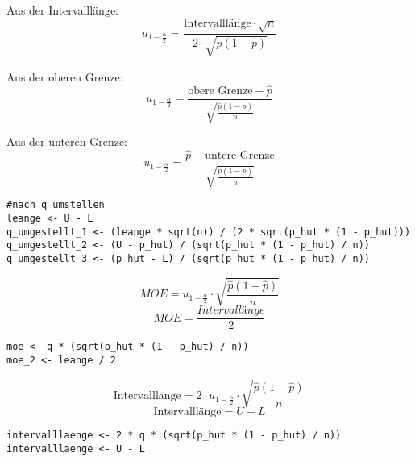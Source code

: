 \begin{multicols*}{2}
Aus der Intervalll\"ange:
\[
u_{1 - \frac{\alpha}{2}} = \frac{\text{Intervalll\"ange} \cdot \sqrt{n}}{2 \cdot \sqrt{\hat{p}(1-\hat{p})}}
\]


Aus der oberen Grenze:
\[
u_{1 - \frac{\alpha}{2}} = \frac{\text{obere Grenze} - \hat{p}}{\sqrt{\frac{\hat{p}(1-\hat{p})}{n}}}
\]

Aus der unteren Grenze:
\[
u_{1 - \frac{\alpha}{2}} = \frac{\hat{p} - \text{untere Grenze}}{\sqrt{\frac{\hat{p}(1-\hat{p})}{n}}}
\]

\begin{lstlisting}
#nach q umstellen
leange <- U - L
q_umgestellt_1 <- (leange * sqrt(n)) / (2 * sqrt(p_hut * (1 - p_hut)))
q_umgestellt_2 <- (U - p_hut) / (sqrt(p_hut * (1 - p_hut) / n))
q_umgestellt_3 <- (p_hut - L) / (sqrt(p_hut * (1 - p_hut) / n))
\end{lstlisting}



\[
MOE = u_{1 - \frac{\alpha}{2}} \cdot \sqrt{\frac{\hat{p}(1-\hat{p})}{n}}
\]
$$
MOE = \frac{Intervallänge}{2}
$$

\begin{lstlisting}
moe <- q * (sqrt(p_hut * (1 - p_hut) / n))
moe_2 <- leange / 2
\end{lstlisting}

\[
\text{Intervalll\"ange} = 2 \cdot u_{1 - \frac{\alpha}{2}} \cdot \sqrt{\frac{\hat{p}(1-\hat{p})}{n}}
\]
$$
\text{Intervalll\"ange} = U - L
$$

\begin{lstlisting}
intervalllaenge <- 2 * q * (sqrt(p_hut * (1 - p_hut) / n))
intervalllaenge <- U - L
\end{lstlisting}

\end{multicols*}